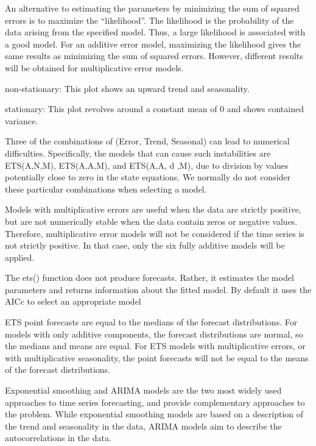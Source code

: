 \documentclass[]{book}
\begin{document}
An alternative to estimating the parameters by minimizing the sum of
squared errors is to maximize the ``likelihood''. The likelihood is the
probability of the data arising from the specified model. Thus, a large
likelihood is associated with a good model. For an additive error model,
maximizing the likelihood gives the same results as minimizing the sum
of squared errors. However, different results will be obtained for
multiplicative error models.

non-stationary: This plot shows an upward trend and seasonality.

stationary: This plot revolves around a constant mean of 0 and shows
contained variance.

Three of the combinations of (Error, Trend, Seasonal) can lead to
numerical difficulties. Specifically, the models that can cause such
instabilities are ETS(A,N,M), ETS(A,A,M), and ETS(A,A, d ,M), due to
division by values potentially close to zero in the state equations. We
normally do not consider these particular combinations when selecting a
model.

Models with multiplicative errors are useful when the data are strictly
positive, but are not numerically stable when the data contain zeros or
negative values. Therefore, multiplicative error models will not be
considered if the time series is not strictly positive. In that case,
only the six fully additive models will be applied.

The ets() function does not produce forecasts. Rather, it estimates the
model parameters and returns information about the fitted model. By
default it uses the AICc to select an appropriate model

ETS point forecasts are equal to the medians of the forecast
distributions. For models with only additive components, the forecast
distributions are normal, so the medians and means are equal. For ETS
models with multiplicative errors, or with multiplicative seasonality,
the point forecasts will not be equal to the means of the forecast
distributions.

Exponential smoothing and ARIMA models are the two most widely used
approaches to time series forecasting, and provide complementary
approaches to the problem. While exponential smoothing models are based
on a description of the trend and seasonality in the data, ARIMA models
aim to describe the autocorrelations in the data.
\end{document}

